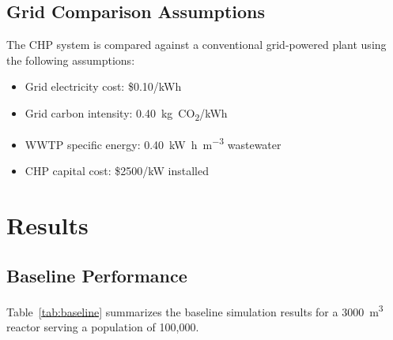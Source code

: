 \documentclass[12pt, letterpaper]{article}
\begin{document}
\subsection{Grid Comparison Assumptions}

The CHP system is compared against a conventional grid-powered plant using the following assumptions:
\begin{itemize}[noitemsep]
  \item Grid electricity cost: \$0.10/kWh
  \item Grid carbon intensity: \SI{0.40}{\kilo\gram}~CO\textsubscript{2}/kWh
  \item WWTP specific energy: \SI{0.40}{\kilo\watt\hour\per\cubic\metre} wastewater
  \item CHP capital cost: \$2500/kW installed
\end{itemize}

\section{Results}

\subsection{Baseline Performance}

Table~\ref{tab:baseline} summarizes the baseline simulation results for a \SI{3000}{\cubic\metre} reactor serving a population of 100,000.
\end{document}
